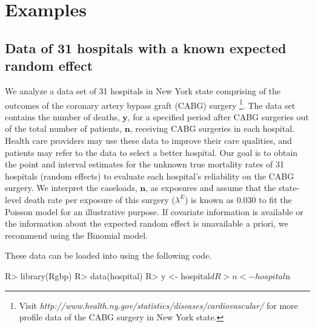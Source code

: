 \documentclass[article]{jss}
\begin{document}
\section[Examples]{Examples}\label{sec6}
\subsection[Known Second-level Mean]{Data of 31 hospitals with a known expected random effect}
\label{sec:ex:hosp}


We analyze a data set of 31 hospitals in New York state comprising of the outcomes of the coronary artery bypass graft (CABG) surgery \citep{morris2012}\footnote{Visit \emph{http://www.health.ny.gov/statistics/diseases/cardiovascular/} for more profile data of the CABG surgery in New York state.}. The data set contains the number of deaths, $\boldsymbol{y}$, for a specified period after CABG surgeries out of the total number of patients, $\boldsymbol{n}$, receiving CABG surgeries in each hospital. Health care providers may use these data to improve their care qualities, and patients may refer to the data to select a better hospital. Our goal is to obtain the point and interval estimates for the unknown true mortality rates of 31 hospitals (random effects) to evaluate  each hospital's reliability on the CABG surgery. We interpret the caseloads, $\boldsymbol{n}$,  as exposures and assume that the state-level death rate per exposure of this surgery ($\lambda^E$) is known as 0.030 to fit the Poisson model for an illustrative purpose.  If covariate information is available or the information about the expected random effect is unavailable a priori, we recommend using the Binomial model.


These data can be loaded into  using the following code.
\begin{CodeChunk}
\begin{CodeInput}
R> library(Rgbp)
R> data(hospital)
R> y <- hospital$d
R> n <- hospital$n
\end{CodeInput}
\end{CodeChunk}




\end{document}
